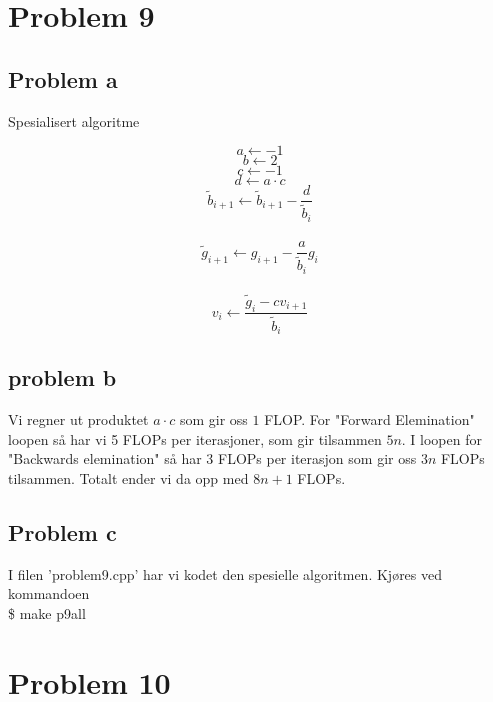 \documentclass[english,notitlepage]{revtex4-1}  %
\begin{document}
\section*{Problem 9}

\subsection*{Problem a}

\begin{algorithm}[H]
	\caption{Spesialisert algoritme}\label{algo:spec}
	\begin{algorithmic}
	\State $$a \leftarrow -1$$
	\State $$b \leftarrow 2$$
	\State $$c \leftarrow -1$$
	\State $$d \leftarrow a \cdot c$$ 
	 
	\State $$\widetilde{b}_{i+1} \leftarrow \widetilde{b}_{i+1} - \frac{d}{\widetilde{b}_i}$$  \\
	\State $$\widetilde{g}_{i+1} \leftarrow g_{i+1} - \frac{a}{\widetilde{b}_i}g_i$$  \\
	\EndFor
	 
	\State $$v_i \leftarrow \frac{\widetilde{g}_i - cv_{i+1}}{\widetilde{b}_i}$$  
	\EndFor
	\end{algorithmic}
\end{algorithm}

\subsection*{problem b}

Vi regner ut produktet $a \cdot c$ som gir oss $1$ FLOP. For "Forward Elemination" loopen så har vi 5 FLOPs per iterasjoner, som gir tilsammen $5n$. I loopen for "Backwards elemination" så har 3 FLOPs per iterasjon som gir oss $3n$ FLOPs tilsammen. Totalt ender vi da opp med $8n + 1$ FLOPs.

\subsection*{Problem c}

I filen 'problem9.cpp' har vi kodet den spesielle algoritmen. Kjøres ved kommandoen \\

\$ make p9all

\section*{Problem 10}
\end{document}
